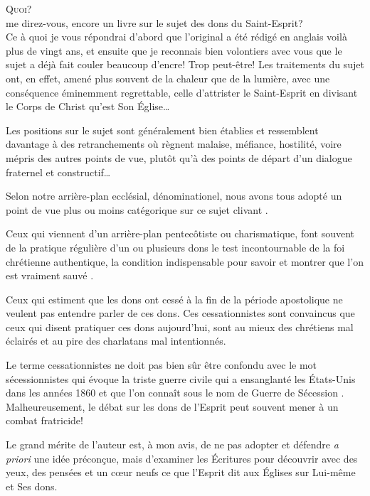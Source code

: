 
\begin{preface}

\lettrine[ante=\Og]{Q}{\Large uoi?}\\[0.2ex]
me direz-vous, encore un livre sur le sujet des dons du Saint-Esprit? \Fg{}\\[1ex]
Ce à quoi je vous répondrai d'abord que l'original a été rédigé en anglais voilà plus de vingt ans, et ensuite que je reconnais bien volontiers avec vous que le sujet a déjà fait couler beaucoup d'encre! Trop peut-être! Les traitements du sujet ont, en effet, amené plus souvent de la \Og chaleur \Fg{} que de la lumière, avec une conséquence éminemment regrettable, celle d'attrister le Saint-Esprit en divisant le Corps de Christ qu'est Son \'Eglise\dots{}

Les positions sur le sujet sont généralement bien établies et ressemblent davantage à des retranchements où règnent malaise, méfiance, hostilité, voire mépris des autres points de vue, plutôt qu'à des points de départ d'un dialogue fraternel et constructif\dots{}

Selon notre arrière-plan ecclésial, dénominationel, nous avons tous adopté un point de vue plus ou moins catégorique sur ce sujet \Og clivant \Fg{}.

Ceux qui viennent d'un arrière-plan pentecôtiste ou charismatique, font souvent de la pratique régulière d'un ou plusieurs dons le test incontournable de la foi chrétienne authentique, la condition indispensable pour savoir et montrer que l'on est \Og vraiment sauvé \Fg{}.

Ceux qui estiment que les dons ont cessé à la fin de la période apostolique ne veulent pas entendre parler de ces dons. Ces \Og cessationnistes \Fg{} sont convaincus que ceux qui disent pratiquer ces dons aujourd'hui, sont au mieux des chrétiens mal éclairés et au pire des charlatans mal intentionnés.

Le terme \Og cessationnistes \Fg{} ne doit pas bien sûr être confondu avec le mot \Og sécessionnistes \Fg{} qui évoque la triste guerre civile qui a ensanglanté les \'Etats-Unis dans les années 1860 et que l'on connaît sous le nom de \Og Guerre de Sécession \Fg{}.
 Malheureusement, le débat sur les dons de l'Esprit peut souvent mener à un combat fratricide!

Le grand mérite de l'auteur est, à mon avis, de ne pas adopter et défendre \emph{a priori} une idée préconçue,
 mais \Og d'examiner les \'Ecritures \Fg{} pour découvrir avec des yeux,
 des pensées et un c\oe{}ur neufs \Og ce que l'Esprit dit aux \'Eglises \Fg{}
 sur Lui-même et Ses dons.


\end{preface}
